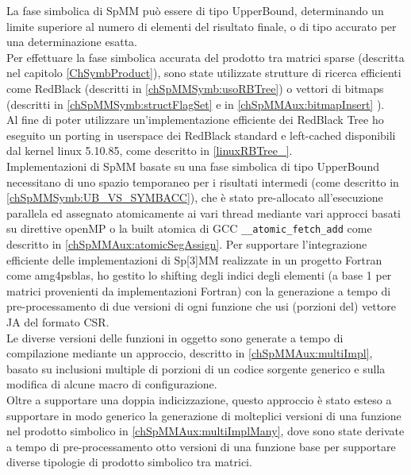 La fase simbolica di SpMM può essere di tipo UpperBound, determinando un limite superiore al numero di elementi \nnz del risultato finale,
o di tipo accurato per una determinazione esatta.\\
Per effettuare la fase simbolica accurata del prodotto tra matrici sparse (descritta nel capitolo \ref{ChSymbProduct}),
sono state utilizzate strutture di ricerca efficienti come RedBlack (descritti in \ref{chSpMMSymb:usoRBTree})
o vettori di bitmaps (descritti in \ref{chSpMMSymb:structFlagSet} e in \ref{chSpMMAux:bitmapInsert} ).\\
Al fine di poter utilizzare un'implementazione efficiente dei RedBlack Tree ho eseguito un porting in userspace
dei RedBlack standard e left-cached disponibili dal kernel linux 5.10.85, come descritto in \ref{linuxRBTree_}.\\
Implementazioni di SpMM basate su una fase simbolica di tipo UpperBound necessitano di uno spazio temporaneo per i risultati intermedi
(come descritto in  \ref{chSpMMSymb:UB_VS_SYMBACC}), che è stato pre-allocato all'esecuzione parallela ed 
assegnato atomicamente ai vari thread mediante vari approcci basati su direttive openMP o la built atomica di GCC
\verb|__atomic_fetch_add| come descritto in \ref{chSpMMAux:atomicSegAssign}.
\voidLine
Per supportare l'integrazione efficiente delle implementazioni di Sp[3]MM realizzate in un progetto Fortran come 
amg4psblas, ho gestito lo shifting degli indici degli elementi \nnz (a base 1 per matrici provenienti da implementazioni Fortran)
con la generazione a tempo di pre-processamento di due versioni di ogni 
funzione che usi (porzioni del) vettore JA del formato CSR.\\
Le diverse versioni delle funzioni in oggetto sono generate a tempo di compilazione
mediante un approccio, descritto in \ref{chSpMMAux:multiImpl}, basato su 
inclusioni multiple di porzioni di un codice sorgente generico e sulla modifica di alcune macro di configurazione.\\
Oltre a supportare una doppia indicizzazione, questo approccio è stato esteso a 
supportare in modo generico la generazione di molteplici versioni di una funzione nel prodotto simbolico in \ref{chSpMMAux:multiImplMany}, 
dove sono state derivate a tempo di pre-processamento otto versioni di una funzione base  per 
supportare diverse tipologie di prodotto simbolico tra matrici.\\

